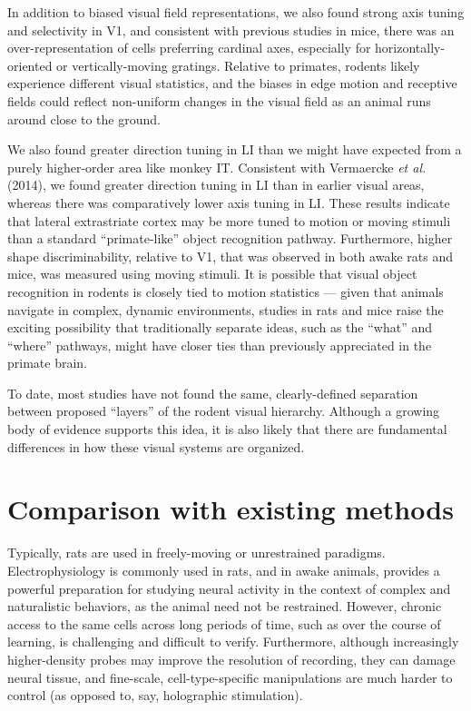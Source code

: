 In addition to biased visual field representations, we also found strong axis tuning and selectivity in V1, and consistent with previous studies in mice, there was an over-representation of cells preferring cardinal axes, especially for horizontally-oriented or vertically-moving gratings. Relative to primates, rodents likely experience different visual statistics, and the biases in edge motion and receptive fields could reflect non-uniform changes in the visual field as an animal runs around close to the ground. 

We also found greater direction tuning in LI than we might have expected from a purely higher-order area like monkey IT. Consistent with Vermaercke \textit{et al.} (2014), we found greater direction tuning in LI than in earlier visual areas, whereas there was comparatively lower axis tuning in LI. These results indicate that lateral extrastriate cortex may be more tuned to motion or moving stimuli than a standard ``primate-like'' object recognition pathway. Furthermore, higher shape discriminability, relative to V1, that was observed in both awake rats\cite{Vermaercke2014} and mice\cite{Froudarakis2020}, was measured using moving stimuli. It is possible that visual object recognition in rodents is closely tied to motion statistics --- given that animals navigate in complex, dynamic environments, studies in rats and mice raise the exciting possibility that traditionally separate ideas, such as the ``what'' and ``where'' pathways, might have closer ties than previously appreciated in the primate brain. 

To date, most studies have not found the same, clearly-defined separation between proposed ``layers'' of the rodent visual hierarchy. Although a growing body of evidence supports this idea, it is also likely that there are fundamental differences in how these visual systems are organized. 

\section{Comparison with existing methods}
Typically, rats are used in freely-moving or unrestrained paradigms. Electrophysiology is commonly used in rats, and in awake animals, provides a powerful preparation for studying neural activity in the context of complex and naturalistic behaviors, as the animal need not be restrained. However, chronic access to the same cells across long periods of time, such as over the course of learning, is challenging and difficult to verify. Furthermore, although increasingly higher-density probes may improve the resolution of recording, they can damage neural tissue, and fine-scale, cell-type-specific manipulations are much harder to control (as opposed to, say, holographic stimulation).  

